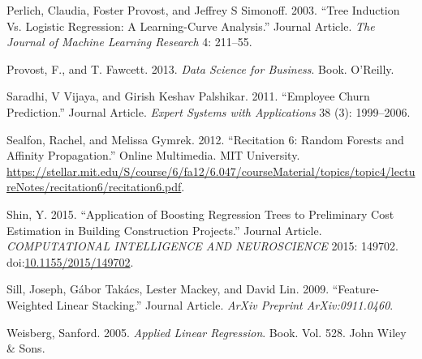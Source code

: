 \documentclass[]{elsarticle} %
\begin{document}
\hypertarget{ref-Perlich2003}{}
Perlich, Claudia, Foster Provost, and Jeffrey S Simonoff. 2003. ``Tree
Induction Vs. Logistic Regression: A Learning-Curve Analysis.'' Journal
Article. \emph{The Journal of Machine Learning Research} 4: 211--55.

\hypertarget{ref-Provost2013}{}
Provost, F., and T. Fawcett. 2013. \emph{Data Science for Business}.
Book. O'Reilly.

\hypertarget{ref-Saradhi2011}{}
Saradhi, V Vijaya, and Girish Keshav Palshikar. 2011. ``Employee Churn
Prediction.'' Journal Article. \emph{Expert Systems with Applications}
38 (3): 1999--2006.

\hypertarget{ref-Sealfon2012}{}
Sealfon, Rachel, and Melissa Gymrek. 2012. ``Recitation 6: Random
Forests and Affinity Propagation.'' Online Multimedia. MIT University.
\url{https://stellar.mit.edu/S/course/6/fa12/6.047/courseMaterial/topics/topic4/lectureNotes/recitation6/recitation6.pdf}.

\hypertarget{ref-Shin2015}{}
Shin, Y. 2015. ``Application of Boosting Regression Trees to Preliminary
Cost Estimation in Building Construction Projects.'' Journal Article.
\emph{COMPUTATIONAL INTELLIGENCE AND NEUROSCIENCE} 2015: 149702.
doi:\href{https://doi.org/10.1155/2015/149702}{10.1155/2015/149702}.

\hypertarget{ref-Sill2009}{}
Sill, Joseph, Gábor Takács, Lester Mackey, and David Lin. 2009.
``Feature-Weighted Linear Stacking.'' Journal Article. \emph{ArXiv
Preprint ArXiv:0911.0460}.

\hypertarget{ref-Weisberg2005}{}
Weisberg, Sanford. 2005. \emph{Applied Linear Regression}. Book. Vol.
528. John Wiley \& Sons.
\end{document}
